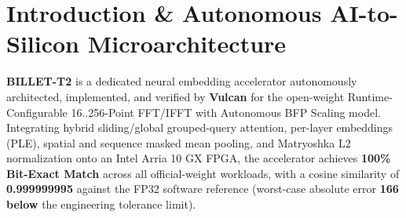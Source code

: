 \documentclass[11pt,a4paper]{article}
\begin{document}
\section{Introduction \& Autonomous AI-to-Silicon Microarchitecture}

\textbf{BILLET-T2} is a dedicated neural embedding accelerator autonomously architected, implemented, and verified by \textbf{Vulcan} for the open-weight Runtime-Configurable 16..256-Point FFT/\allowbreak{}IFFT with Autonomous BFP Scaling model. Integrating hybrid sliding/global grouped-query attention, per-layer embeddings (PLE), spatial and sequence masked mean pooling, and Matryoshka L2 normalization onto an Intel Arria 10 GX FPGA, the accelerator achieves \textbf{100\% Bit-Exact Match} across all official-weight workloads, with a cosine similarity of \textbf{0.999999995} against the FP32 software reference (worst-case absolute error \textbf{166\texttimes{} below} the engineering tolerance limit).

\vspace{2pt}
\end{document}
